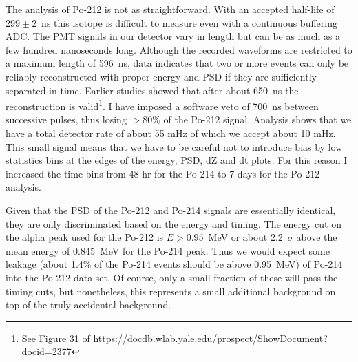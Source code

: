 The analysis of Po-212 is not as straightforward. With an accepted half-life of $299\pm2$~ns this isotope is difficult to measure even with a continuous buffering ADC. The PMT signals in our detector vary in length but can be as much as a few hundred nanoseconds long. Although the recorded waveforms are restricted to a maximum length of 596~ns, data indicates that two or more events can only be reliably reconstructed with proper energy and PSD if they are sufficiently separated in time. Earlier studies showed that after about 650~ns the reconstruction is valid\footnote{See Figure 31 of https://docdb.wlab.yale.edu/prospect/ShowDocument?docid=2377}. I have imposed a software veto of 700~ns between successive pulses, thus losing $>$80\% of the Po-212 signal. Analysis shows that we have a total detector rate of about 55 mHz of which we accept about 10 mHz. This small signal means that we have to be careful not to introduce bias by low statistics bins at the edges of the energy, PSD, dZ and dt plots. For this reason I increased the time bins from 48 hr for the Po-214 to 7 days for the Po-212 analysis. 

Given that the PSD of the Po-212 and Po-214 signals are essentially identical, they are only discriminated based on the energy and timing. The energy cut on the alpha peak used for the Po-212 is $E>0.95$~MeV or about 2.2~$\sigma$ above the mean energy of 0.845~MeV for the Po-214 peak. Thus we would expect some leakage (about 1.4\% of the Po-214 events should be above 0.95~MeV) of Po-214 into the Po-212 data set. Of course, only a small fraction of these will pass the timing cuts, but nonetheless, this represents a small additional background on top of the truly accidental background. 

